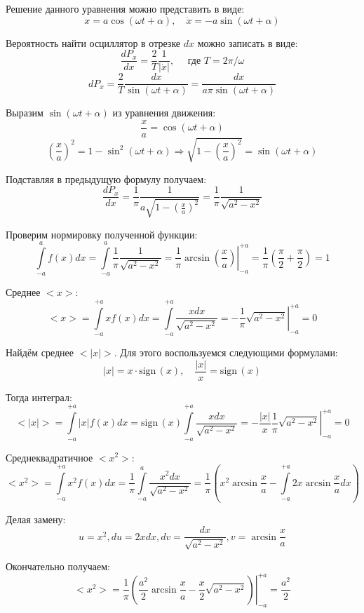 \documentclass[14pt,final,titlepage,pscyr]{hedsemwork}
\newcommand{\sign}{\mathrm{sign\,}}
\begin{document}
Решение данного уравнения можно представить в виде:
\[
	x = a\cos(\omega t + \alpha), \quad
	\dot{x} = -a\sin(\omega t + \alpha)
\]

Вероятность найти осциллятор в отрезке \( dx \) можно записать в виде:
\[
	\frac{dP_x}{dx} = \frac{2}{T}\frac{1}{|\dot{x}|}, \quad 
		\text{ где } T = 2\pi/\omega
\]
\[
	dP_x = \frac{2}{T}\frac{dx}{\sin(\omega t + \alpha)} = 
		\frac{dx}{a\pi\sin(\omega t + \alpha)}
\]

Выразим \( \sin(\omega t + \alpha )\) из уравнения движения:
\[
	\frac{x}{a} = \cos(\omega t + \alpha)
\]
\[
	\left( \frac{x}{a} \right)^2 = 1 - \sin^2(\omega t + \alpha) 
		\Rightarrow \sqrt{1-\left( \frac{x}{a} \right)^2} = 
		\sin(\omega t + \alpha)
\]

Подставляя в предыдущую формулу получаем:
\[
	\frac{dP_x}{dx} = \frac{1}{\pi}
		\frac{1}{a\sqrt{1-\left( \frac{x}{a} \right)^2}} = 
		\frac{1}{\pi}\frac{1}{\sqrt{a^2-x^2}}
\]

Проверим нормировку полученной функции:
\[
	\int\limits_{-a}^{a} f(x)dx = 
		\int\limits_{-a}^{a} \frac{1}{\pi}\frac{1}{\sqrt{a^2-x^2}} = 
		\left. 
			\frac{1}{\pi}\arcsin\left( \frac{x}{a} \right) 
		\right|_{-a}^{+a} = \frac{1}{\pi}
		\left( \frac{\pi}{2} + \frac{\pi}{2} \right) = 1
\]

Среднее \( <x> \):
\[
	<x> = \int\limits_{-a}^{+a} xf(x)dx = 
		\int\limits_{-a}^{+a} \frac{xdx}{\sqrt{a^2-x^2}} = 
		\left. -\frac{1}{\pi}\sqrt{a^2-x^2}\right|_{-a}^{+a} = 0 
\]

Найдём среднее \( <|x|> \). Для этого воспользуемся следующими
формулами:
\[
	|x|=x\cdot\sign(x), \quad \frac{|x|}{x} = \sign(x)
\]

Тогда интеграл:
\[
	<|x|> = \int\limits_{-a}^{+a} |x|f(x)dx = 
		\sign(x)\int\limits_{-a}^{+a} \frac{xdx}{\sqrt{a^2-x^2}} = 
		\left. 
			-\frac{|x|}{x}\frac{1}{\pi}\sqrt{a^2-x^2} 
		\right|_{-a}^{+a} = 0 
\]

Среднеквадратичное \( <x^2> \):
\[
	<x^2> = \int\limits_{-a}^{+a} x^2f(x)dx =
		\frac{1}{\pi}\int\limits_{-a}^{a} 
		\frac{x^2dx}{\sqrt{a^2-x^2}} = 
		\frac{1}{\pi}\left( x^2\arcsin\frac{x}{a} - 
		\int\limits_{-a}^{+a} 2x \arcsin\frac{x}{a} dx \right)
\]

Делая замену:
\[
	u = x^2, du = 2xdx, dv = \frac{dx}{\sqrt{a^2-x^2}}, 
	v = \arcsin\frac{x}{a}
\]

Окончательно получаем:
\[
	<x^2> = \left. \frac{1}{\pi} \left( 
		\frac{a^2}{2}\arcsin\frac{x}{a} - 
		\frac{x}{2}\sqrt{a^2-x^2} \right)\right|_{-a}^{+a} = 
		\frac{a^2}{2}
\]
\end{document}
